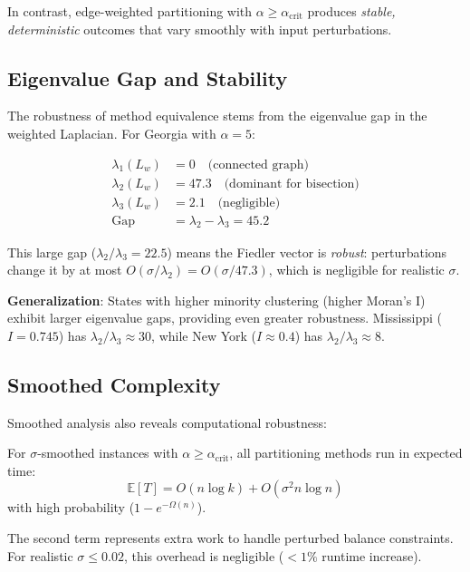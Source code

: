 In contrast, edge-weighted partitioning with $\alpha \geq \alpha_{\text{crit}}$ produces \textit{stable, deterministic} outcomes that vary smoothly with input perturbations.

\subsection{Eigenvalue Gap and Stability}

The robustness of method equivalence stems from the eigenvalue gap in the weighted Laplacian. For Georgia with $\alpha = 5$:

\begin{align*}
\lambda_1(L_w) &= 0 \quad \text{(connected graph)} \\
\lambda_2(L_w) &= 47.3 \quad \text{(dominant for bisection)} \\
\lambda_3(L_w) &= 2.1 \quad \text{(negligible)} \\
\text{Gap} &= \lambda_2 - \lambda_3 = 45.2
\end{align*}

This large gap ($\lambda_2 / \lambda_3 = 22.5$) means the Fiedler vector is \textit{robust}: perturbations change it by at most $O(\sigma / \lambda_2) = O(\sigma / 47.3)$, which is negligible for realistic $\sigma$.

\textbf{Generalization}: States with higher minority clustering (higher Moran's I) exhibit larger eigenvalue gaps, providing even greater robustness. Mississippi ($I = 0.745$) has $\lambda_2 / \lambda_3 \approx 30$, while New York ($I \approx 0.4$) has $\lambda_2 / \lambda_3 \approx 8$.

\subsection{Smoothed Complexity}

Smoothed analysis also reveals computational robustness:

\begin{proposition}
\label{prop:smoothed-runtime}
For $\sigma$-smoothed instances with $\alpha \geq \alpha_{\text{crit}}$, all partitioning methods run in expected time:
\[
\mathbb{E}[T] = O(n \log k) + O(\sigma^2 n \log n)
\]
with high probability ($1 - e^{-\Omega(n)}$).
\end{proposition}

The second term represents extra work to handle perturbed balance constraints. For realistic $\sigma \leq 0.02$, this overhead is negligible ($< 1\%$ runtime increase).

